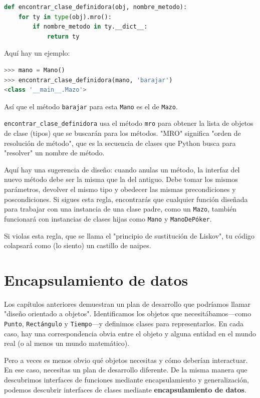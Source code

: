 \begin{lstlisting}[language=Python]
def encontrar_clase_definidora(obj, nombre_metodo):
    for ty in type(obj).mro():
        if nombre_metodo in ty.__dict__:
            return ty
\end{lstlisting}

Aquí hay un ejemplo:

\begin{lstlisting}[language=Python]
>>> mano = Mano()
>>> encontrar_clase_definidora(mano, 'barajar')
<class '__main__.Mazo'>
\end{lstlisting}

Así que el método \texttt{barajar} para esta \texttt{Mano} es el de \texttt{Mazo}.

\texttt{encontrar\_clase\_definidora} usa el método \texttt{mro} para obtener la lista de objetos de clase (tipos) que se buscarán para los métodos. "MRO" significa "orden de resolución de método", que es la secuencia de clases que Python busca para "resolver" un nombre de método.

Aquí hay una sugerencia de diseño: cuando anulas un método, la interfaz del nuevo método debe ser la misma que la del antiguo. Debe tomar los mismos parámetros, devolver el mismo tipo y obedecer las mismas precondiciones y poscondiciones. Si sigues esta regla, encontrarás que cualquier función diseñada para trabajar con una instancia de una clase padre, como un \texttt{Mazo}, también funcionará con instancias de clases hijas como \texttt{Mano} y \texttt{ManoDePóker}.

Si violas esta regla, que se llama el "principio de sustitución de Liskov", tu código colapsará como (lo siento) un castillo de naipes.

\section{Encapsulamiento de datos}

Los capítulos anteriores demuestran un plan de desarrollo que podríamos llamar "diseño orientado a objetos". Identificamos los objetos que necesitábamos—como \texttt{Punto}, \texttt{Rectángulo} y \texttt{Tiempo}—y definimos clases para representarlos. En cada caso, hay una correspondencia obvia entre el objeto y alguna entidad en el mundo real (o al menos un mundo matemático).

Pero a veces es menos obvio qué objetos necesitas y cómo deberían interactuar. En ese caso, necesitas un plan de desarrollo diferente. De la misma manera que descubrimos interfaces de funciones mediante encapsulamiento y generalización, podemos descubrir interfaces de clases mediante \textbf{encapsulamiento de datos}.

